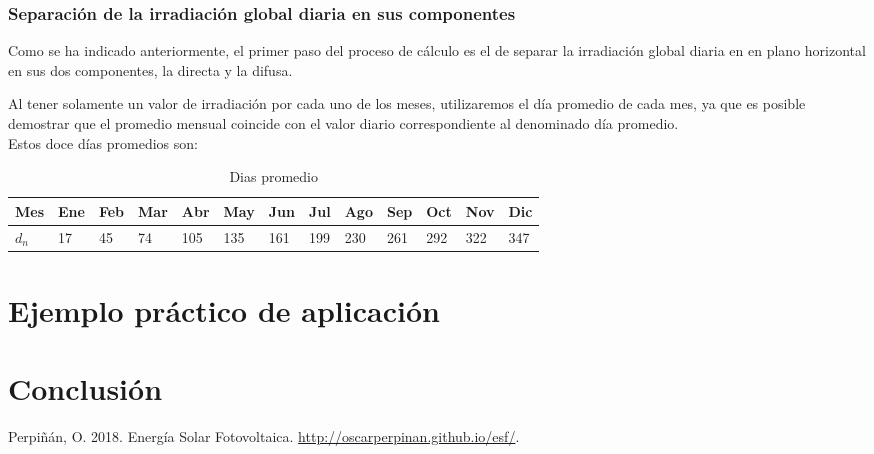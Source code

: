 \documentclass[11pt]{report}
\begin{document}
\subsection{Separación de la irradiación global diaria en sus componentes}

Como se ha indicado anteriormente, el primer paso del proceso de cálculo es el de separar la irradiación global diaria en en plano horizontal en sus dos componentes, la directa y la difusa.

Al tener solamente un valor de irradiación por cada uno de los meses, utilizaremos el día promedio de cada mes, ya que es posible demostrar que el promedio mensual coincide con el valor diario correspondiente al denominado día promedio.\\

Estos doce días promedios son:

\begin{table}[ht]
\centering
\begin{tabular}{|l|l|l|l|l|l|l|l|l|l|l|l|l|}
\hline
Mes   & Ene & Feb & Mar & Abr & May & Jun & Jul & Ago & Sep & Oct & Nov & Dic \\ \hline
$d_n$ & 17  & 45  & 74  & 105  & 135  & 161  & 199  & 230  & 261  & 292  & 322 & 347  \\ \hline
\end{tabular}
\label{tab:dias_promedio}
\caption{Dias promedio}
\end{table}

\chapter{Ejemplo práctico de aplicación}

\chapter{Conclusión}


\pagebreak

\begin{thebibliography}{99}
 Perpiñán, O. 2018. Energía Solar Fotovoltaica. \url{http://oscarperpinan.github.io/esf/}. 
\end{thebibliography}
\end{document}
